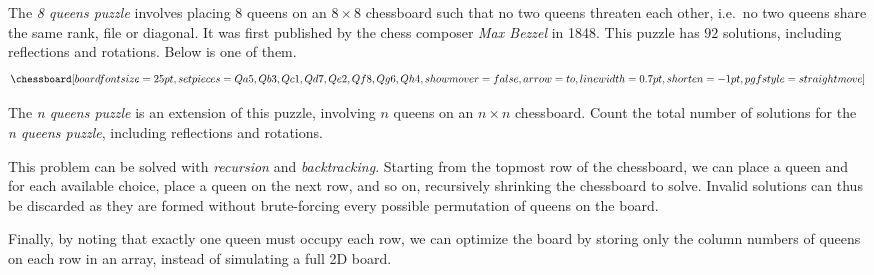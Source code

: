 
\problem The {\em 8 queens puzzle} involves placing $8$ queens on an $8 \times 8$ chessboard such that no two queens
threaten each other, i.e.\ no two queens share the same rank, file or diagonal. It was first published by the chess
composer {\it Max Bezzel} in 1848. This puzzle has $92$ solutions, including reflections and rotations.
Below is one of them.
\[\chessboard[boardfontsize=25pt,
		  setpieces={Qa5, Qb3, Qc1, Qd7, Qe2, Qf8, Qg6, Qh4},
		  showmover=false,
		  arrow=to, linewidth=0.7pt, shorten=-1pt,
		  pgfstyle=straightmove]\]

The {\em n queens puzzle} is an extension of this puzzle, involving $n$ queens on an $n \times n$ chessboard.
Count the total number of solutions for the {\em n queens puzzle}, including reflections and rotations.

\solution This problem can be solved with \textit{recursion} and \textit{backtracking}. Starting from the topmost row of the chessboard,
we can place a queen and for each available choice, place a queen on the next row, and so on, recursively shrinking the chessboard to
solve. Invalid solutions can thus be discarded as they are formed without brute-forcing every possible permutation of queens on the board.

Finally, by noting that exactly one queen must occupy each row, we can optimize the board by storing only the column numbers of queens
on each row in an array, instead of simulating a full 2D board.

